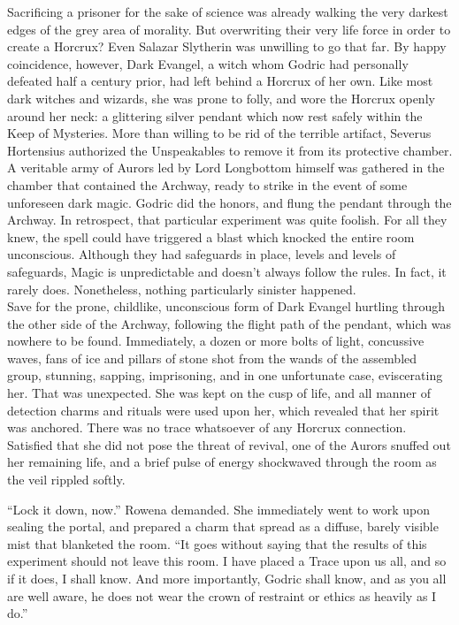 Sacrificing a prisoner for the sake of science was already walking the very darkest edges of the grey area of morality. But overwriting their very life force in order to create a Horcrux? Even Salazar Slytherin was unwilling to go that far. By happy coincidence, however, Dark Evangel, a witch whom Godric had personally defeated half a century prior, had left behind a Horcrux of her own. Like most dark witches and wizards, she was prone to folly, and wore the Horcrux openly around her neck: a glittering silver pendant which now rest safely within the Keep of Mysteries.
\SmallVSpace
More than willing to be rid of the terrible artifact, Severus Hortensius authorized the Unspeakables to remove it from its protective chamber. A veritable army of Aurors led by Lord Longbottom himself was gathered in the chamber that contained the Archway, ready to strike in the event of some unforeseen dark magic.
\SomeVSpace
Godric did the honors, and flung the pendant through the Archway. In retrospect, that particular experiment was quite foolish. For all they knew, the spell could have triggered a blast which knocked the entire room unconscious. Although they had safeguards in place, levels and levels of safeguards, Magic is unpredictable and doesn’t always follow the rules. In fact, it rarely does.
\SmallVSpace
Nonetheless, nothing particularly sinister happened.\\Save for the prone, childlike, unconscious form of Dark Evangel hurtling through the other side of the Archway, following the flight path of the pendant, which was nowhere to be found. Immediately, a dozen or more bolts of light, concussive waves, fans of ice and pillars of stone shot from the wands of the assembled group, stunning, sapping, imprisoning, and in one unfortunate case, eviscerating her.
\SmallVSpace
That was unexpected.
\SmallVSpace
She was kept on the cusp of life, and all manner of detection charms and rituals were used upon her, which revealed that her spirit was anchored. There was no trace whatsoever of any Horcrux connection. Satisfied that she did not pose the threat of revival, one of the Aurors snuffed out her remaining life, and a brief pulse of energy shockwaved through the room as the veil rippled softly.

“Lock it down, now.” Rowena demanded. She immediately went to work upon sealing the portal, and prepared a charm that spread as a diffuse, barely visible mist that blanketed the room. “It goes without saying that the results of this experiment should not leave this room. I have placed a Trace upon us all, and so if it does, I shall know. And more importantly, Godric shall know, and as you all are well aware, he does not wear the crown of restraint or ethics as heavily as I do.”

